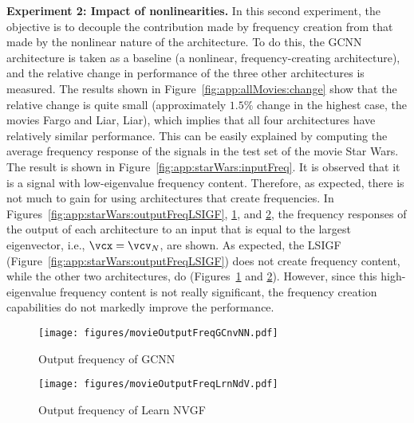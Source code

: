 \textbf{Experiment 2: Impact of nonlinearities.} In this second experiment, the objective is to decouple the contribution made by frequency creation from that made by the nonlinear nature of the architecture. To do this, the GCNN architecture is taken as a baseline (a nonlinear, frequency-creating architecture), and the relative change in performance of the three other architectures is measured. The results shown in Figure~\ref{fig:app:allMovies:change} show that the relative change is quite small (approximately $1.5\%$ change in the highest case, the movies Fargo and Liar, Liar), which implies that all four architectures have relatively similar performance. This can be easily explained by computing the average frequency response of the signals in the test set of the movie Star Wars. The result is shown in Figure~\ref{fig:app:starWars:inputFreq}. It is observed that it is a signal with low-eigenvalue frequency content. Therefore, as expected, there is not much to gain for using architectures that create frequencies. In Figures~\ref{fig:app:starWars:outputFreqLSIGF}, \ref{fig:app:starWars:outputFreqGCNN}, and \ref{fig:app:starWars:outputFreqLearn}, the frequency responses of the output of each architecture to an input that is equal to the largest eigenvector, i.e., $\vcx = \vcv_{N}$, are shown. As expected, the LSIGF (Figure~\ref{fig:app:starWars:outputFreqLSIGF}) does not create frequency content, while the other two architectures, do (Figures~\ref{fig:app:starWars:outputFreqGCNN} and \ref{fig:app:starWars:outputFreqLearn}). However, since this high-eigenvalue frequency content is not really significant, the frequency creation capabilities do not markedly improve the performance.

\begin{figure}
    \centering
    \texttt{[image: figures/movieOutputFreqGCnvNN.pdf]}
    \caption{Output frequency of GCNN}
    \label{fig:app:starWars:outputFreqGCNN}
\end{figure}
\hfill
\begin{figure}
    \centering
    \texttt{[image: figures/movieOutputFreqLrnNdV.pdf]}
    \caption{Output frequency of Learn NVGF}
    \label{fig:app:starWars:outputFreqLearn}
\end{figure}


